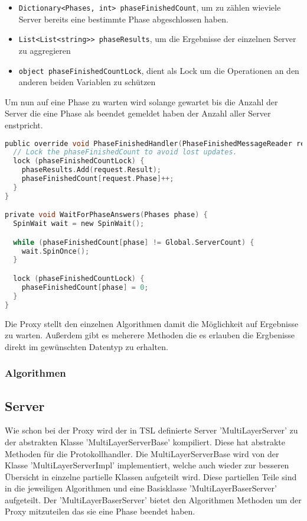 \begin{itemize}
  \item \verb|Dictionary<Phases, int> phaseFinishedCount|, um zu zählen wieviele Server bereits eine bestimmte Phase abgeschlossen haben.
  \item \verb|List<List<string>> phaseResults|, um die Ergebnisse der einzelnen Server zu aggregieren
  \item \verb|object phaseFinishedCountLock|, dient als Lock um die Operationen an den anderen beiden Variablen zu schützen
\end{itemize}


Um nun auf eine Phase zu warten wird solange gewartet bis die Anzahl der Server die eine Phase als beendet gemeldet haben der Anzahl aller Server enstpricht.

\begin{lstlisting}[language=c]
public override void PhaseFinishedHandler(PhaseFinishedMessageReader request) {
  // Lock the phaseFinishedCount to avoid lost updates.
  lock (phaseFinishedCountLock) {
    phaseResults.Add(request.Result);
    phaseFinishedCount[request.Phase]++;
  }
}

private void WaitForPhaseAnswers(Phases phase) {
  SpinWait wait = new SpinWait();

  while (phaseFinishedCount[phase] != Global.ServerCount) {
    wait.SpinOnce();
  }

  lock (phaseFinishedCountLock) {
    phaseFinishedCount[phase] = 0;
  }
}
\end{lstlisting}

Die Proxy stellt den einzelnen Algorithmen damit die Möglichkeit auf Ergebnisse zu warten. Außerdem gibt es meherere Methoden die es erlauben die Ergbenisse direkt im gewünschten Datentyp zu erhalten.

\subsubsection{Algorithmen}



\subsection{Server}

Wie schon bei der Proxy wird der in TSL definierte Server 'MultiLayerServer' zu der abstrakten Klasse 'MultiLayerServerBase' kompiliert. Diese hat abstrakte Methoden für die Protokollhandler.
Die MultiLayerServerBase wird von der Klasse 'MultiLayerServerImpl' implementiert, welche auch wieder zur besseren Übersicht in einzelne partielle Klassen aufgeteilt wird. Diese partiellen Teile sind in die jeweiligen Algorithmen und eine Basisklasse 'MultiLayerBaserServer' aufgeteilt.
Der 'MultiLayerBaserServer' bietet den Algorithmen Methoden um der Proxy mitzuteilen das sie eine Phase beendet haben.


